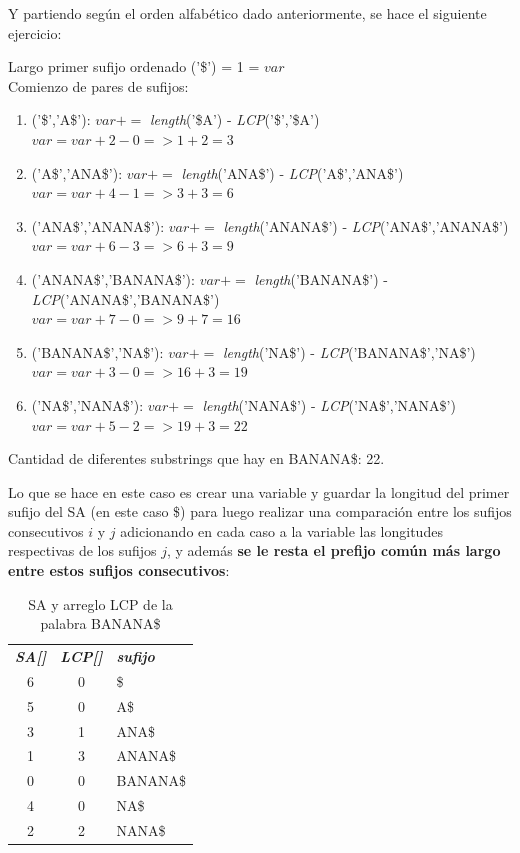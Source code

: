 Y partiendo según el orden alfabético dado anteriormente, se hace el siguiente ejercicio:

Largo primer sufijo ordenado ('\$') = 1 = $var$\\
Comienzo de pares de sufijos:
\begin{enumerate}
	\item ('\$','A\$'): $var +=$ {\it{length}}('\$A') - {\it{LCP}}('\$','\$A')\\
	$var=var+2-0 =>  1+2=3$

	\item ('A\$','ANA\$'): $var +=$ {\it{length}}('ANA\$') - {\it{LCP}}('A\$','ANA\$')\\
	$var=var+4-1 =>  3+3=6$
	
	\item ('ANA\$','ANANA\$'): $var +=$ {\it{length}}('ANANA\$') - {\it{LCP}}('ANA\$','ANANA\$')\\
	$var=var+6-3 =>  6+3=9$
	
	\item ('ANANA\$','BANANA\$'): $var +=$ {\it{length}}('BANANA\$') - {\it{LCP}}('ANANA\$','BANANA\$')\\
	$var=var+7-0 =>  9+7=16$
	
	\item ('BANANA\$','NA\$'): $var +=$ {\it{length}}('NA\$') - {\it{LCP}}('BANANA\$','NA\$')\\
	$var=var+3-0 =>  16+3=19$
	
	\item ('NA\$','NANA\$'): $var +=$ {\it{length}}('NANA\$') - {\it{LCP}}('NA\$','NANA\$')\\
	$var=var+5-2 =>  19+3=22$
	
\end{enumerate}

Cantidad de diferentes substrings que hay en BANANA\$: 22.

Lo que se hace en este caso es crear una variable y guardar la longitud del primer sufijo del SA (en este caso \$) para luego realizar una comparación entre los sufijos consecutivos $i$ y $j$ adicionando en cada caso a la variable las longitudes respectivas de los sufijos $j$, y además \textbf{se le resta el prefijo común más largo entre estos sufijos consecutivos}:

\begin{table}[H]
	\centering
	\label{propuesta-1}
	\begin{tabular}{c c l}
		\textit{\textbf{SA[]}} & \textit{\textbf{LCP[]}} &\textit{\textbf{sufijo}}\\
		6 & 0 & \$\\
		5 & 0 & A\$\\
		3 & 1 & ANA\$\\
		1 & 3 & ANANA\$\\
		0 & 0 & BANANA\$\\
		4 & 0 & NA\$\\
		2 & 2 & NANA\$\\
	\end{tabular}
\caption{SA y arreglo LCP de la palabra BANANA\$}
\end{table}

